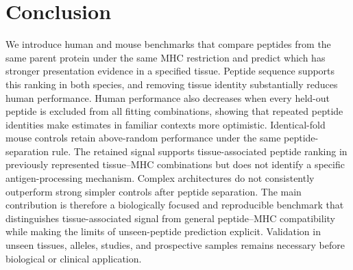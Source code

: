 \section{Conclusion}
We introduce human and mouse benchmarks that compare peptides from the same parent protein under the same MHC restriction and predict which has stronger presentation evidence in a specified tissue. Peptide sequence supports this ranking in both species, and removing tissue identity substantially reduces human performance. Human performance also decreases when every held-out peptide is excluded from all fitting combinations, showing that repeated peptide identities make estimates in familiar contexts more optimistic. Identical-fold mouse controls retain above-random performance under the same peptide-separation rule. The retained signal supports tissue-associated peptide ranking in previously represented tissue--MHC combinations but does not identify a specific antigen-processing mechanism. Complex architectures do not consistently outperform strong simpler controls after peptide separation. The main contribution is therefore a biologically focused and reproducible benchmark that distinguishes tissue-associated signal from general peptide--MHC compatibility while making the limits of unseen-peptide prediction explicit. Validation in unseen tissues, alleles, studies, and prospective samples remains necessary before biological or clinical application.

